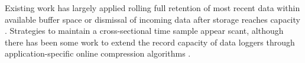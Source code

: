 Existing work has largely applied rolling full retention of most recent data within available buffer space \citep{fincham1995use} or dismissal of incoming data after storage reaches capacity \citep{saunders1989portable,mahzan2017design}.
Strategies to maintain a cross-sectional time sample appear scant, although there has been some work to extend the record capacity of data loggers through application-specific online compression algorithms \citep{hadiatna2016design}.
